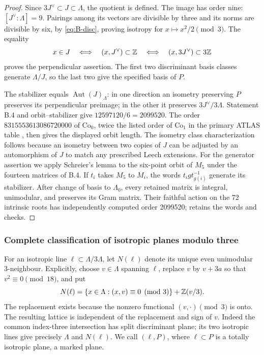 \begin{proof}
Since \(3J^\vee\subset J\subset\Lambda\), the quotient is defined.
The image has order nine: \([J^\vee:\Lambda]=9\). Pairings among
its vectors are divisible by three and its norms are divisible by
six, by \eqref{eq:B-disc}, proving isotropy for
\(x\mapsto x^2/2\pmod3\). The equality
\[
 x\in J\quad\Longleftrightarrow\quad
 (x,J^\vee)\subset\mathbb Z
 \quad\Longleftrightarrow\quad
 (x,3J^\vee)\subset3\mathbb Z
\]
proves the perpendicular assertion. The first two discriminant
basis classes generate \(\Lambda/J\), so the last two give the
specified basis of \(P\).

The stabilizer equals \(\operatorname{Aut}(J)_\Lambda\): in one
direction an isometry preserving \(P\) preserves its perpendicular
preimage; in the other it preserves \(3J^\vee/3\Lambda\). Statement
B.4 and orbit--stabilizer give \(12597120/6=2099520\). The order
\(8315553613086720000\) of \(\mathrm{Co}_0\), twice the listed
order of \(\mathrm{Co}_1\) in the primary ATLAS table
\citep{B_ATLASCo1}, then gives the displayed
orbit length. The isometry class characterization follows because
an isometry between two copies of \(J\) can be adjusted by an
automorphism of \(J\) to match any prescribed Leech extensions.
For the generator assertion we apply Schreier's lemma to the
six-point orbit of \(M_5\) under the fourteen matrices of B.4.
If \(t_i\) takes \(M_5\) to \(M_i\), the words
\(t_i g t_{g(i)}^{-1}\) generate its stabilizer. After change of
basis to \(\Lambda_0\), every retained matrix is integral,
unimodular, and preserves its Gram matrix. Their faithful action on
the 72 intrinsic roots has independently computed order 2099520;
 retains the words and checks.
\end{proof}

\subsubsection{Complete classification of isotropic planes modulo three}

For an isotropic line \(\ell\subset\Lambda/3\Lambda\), let
\(N(\ell)\) denote its unique even unimodular 3-neighbour. Explicitly,
choose \(v\in\Lambda\) spanning \(\ell\), replace \(v\) by
\(v+3a\) so that \(v^2\equiv0\pmod {18}\), and put
\[
 N(\ell)=\{x\in\Lambda:(x,v)\equiv0\pmod3\}+\mathbb Z(v/3).
\]
The replacement exists because the nonzero functional
\((v,{\cdot})\pmod3\) is onto. The resulting lattice is independent
of the replacement and sign of \(v\). Indeed the common index-three
intersection has split discriminant plane; its two isotropic lines
give precisely \(\Lambda\) and \(N(\ell)\). We call \((\ell,P)\),
where \(\ell\subset P\) is a totally isotropic plane, a marked plane.

